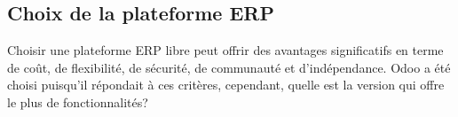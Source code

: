 


\subsection{Choix de la plateforme ERP}

Choisir une plateforme ERP libre peut offrir des avantages significatifs en terme de coût, de flexibilité, de sécurité, de communauté et d'indépendance. Odoo a été choisi puisqu'il répondait à ces critères, cependant, quelle est la version qui offre le plus de fonctionnalités?

